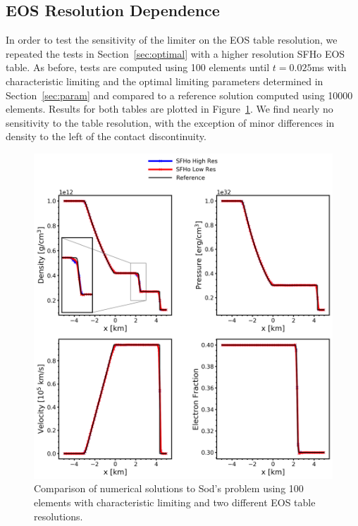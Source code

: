 \documentclass[onecolumn]{aastex62}
\begin{document}
\subsection{EOS Resolution Dependence}
\label{sec:eosRes}
In order to test the sensitivity of the limiter on the EOS table resolution,
we repeated the tests in Section~\ref{sec:optimal} with a higher resolution
SFHo EOS table. As before, tests are computed using 100 elements until
$t = 0.025$ms with characteristic limiting and the optimal limiting parameters determined in
Section~\ref{sec:param} and compared to a reference solution computed using
10000 elements. Results for both tables are plotted in Figure~\ref{fig:SodSedovSFHoRes}.
We find nearly no sensitivity to the table resolution, with the exception of
minor differences in density to the left of the contact discontinuity.
\begin{figure}[h!]
  \centering
  \includegraphics[width=36pc]{./figures/eos_res.png}
  \caption{\label{fig:SodSedovSFHoRes} Comparison of numerical solutions to
  Sod's problem using 100 elements with characteristic limiting and two
  different EOS table resolutions.}
\end{figure}
\end{document}
